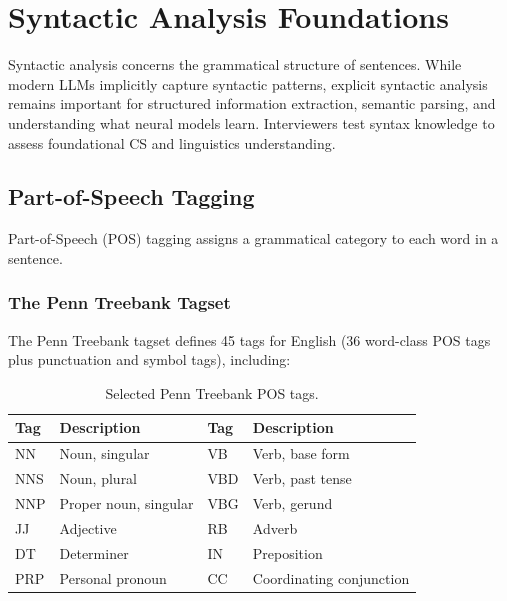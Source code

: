 \section{Syntactic Analysis Foundations}
\label{sec:syntax}

Syntactic analysis concerns the grammatical structure of sentences. While modern LLMs
implicitly capture syntactic patterns, explicit syntactic analysis remains important for
structured information extraction, semantic parsing, and understanding what neural models
learn. Interviewers test syntax knowledge to assess foundational CS and linguistics
understanding.

\subsection{Part-of-Speech Tagging}
\label{sec:pos_tagging}

Part-of-Speech (POS) tagging assigns a grammatical category to each word in a sentence.

\subsubsection{The Penn Treebank Tagset}

The Penn Treebank tagset defines 45 tags for English (36 word-class POS tags plus
punctuation and symbol tags), including:

\begin{table}[H]
\centering
\caption{Selected Penn Treebank POS tags.}
\label{tab:pos_tags}
\small
\begin{tabular}{@{}llll@{}}
\toprule
\textbf{Tag} & \textbf{Description} & \textbf{Tag} & \textbf{Description} \\
\midrule
NN & Noun, singular & VB & Verb, base form \\
NNS & Noun, plural & VBD & Verb, past tense \\
NNP & Proper noun, singular & VBG & Verb, gerund \\
JJ & Adjective & RB & Adverb \\
DT & Determiner & IN & Preposition \\
PRP & Personal pronoun & CC & Coordinating conjunction \\
\bottomrule
\end{tabular}
\end{table}

